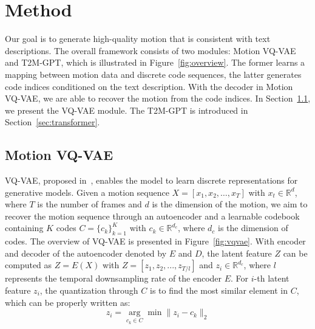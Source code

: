\documentclass[10pt,twocolumn,letterpaper]{article}
\begin{document}
\section{Method}
\label{sec:method}
Our goal is to generate high-quality motion that is consistent with text descriptions. The overall framework consists of two modules: Motion VQ-VAE and T2M-GPT, which is illustrated in Figure~\ref{fig:overview}. The former learns a mapping between motion data and discrete code sequences, the latter generates code indices conditioned on the text description. With the decoder in Motion VQ-VAE, we are able to recover the motion from the code indices. In Section~\ref{sec:vqvae}, we present the VQ-VAE module. The T2M-GPT is introduced in Section~\ref{sec:transformer}.

\subsection{Motion VQ-VAE}
\label{sec:vqvae}

VQ-VAE, proposed in~\cite{van2017neural}, enables the model to learn discrete representations for generative models. Given a motion sequence $X = [x_1, x_2, \ldots, x_T ]$ with $x_t \in \mathbb{R}^{d}$, where $T$ is the number of frames and $d$ is the dimension of the motion, we aim to recover the motion sequence through an autoencoder and a learnable codebook containing $K$ codes $C=\{c_k\}_{k=1}^K$ with $c_k \in \mathbb{R}^{d_c}$, where $d_c$ is the dimension of codes. The overview of VQ-VAE is presented in Figure~\ref{fig:vqvae}. With encoder and decoder of the autoencoder denoted by $E$ and $D$, the latent feature $Z$ can be computed as $Z = E(X)$ with $Z = [z_1, z_2, ..., z_{T/l}]$ and $z_i \in \mathbb{R}^{d_c}$, where $l$ represents the temporal downsampling rate of the encoder $E$. For $i$-th latent feature $z_i$, the quantization through $C$ is to find the most similar element in $C$, which can be properly written as:
\begin{equation}
\hat{z_i} =  \underset{c_k\in C}\arg\min\|z_i - c_k\|_2
\label{formula:1}
\end{equation}
\end{document}
